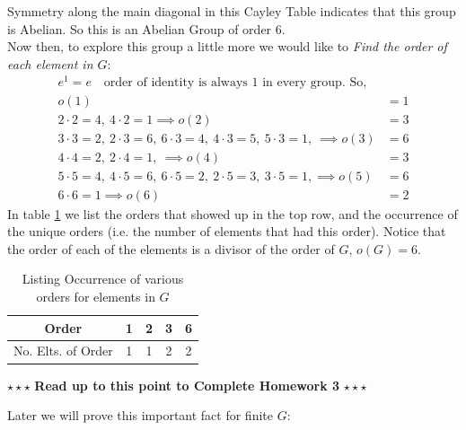 \begin{example}
\noindent Symmetry along the main diagonal in this Cayley Table indicates that this group is Abelian. So this is an Abelian Group of order 6. \steezybreak\\
\noindent Now then, to explore this group a little more we would like to \textit{Find the order of each element in $G$}:
\begin{align}
    e^1=e \ \ \ \text{ order of identity is always 1 in every group. So,}  \nonumber \\
    o(1)&=1  \nonumber \\
    2\cdot 2= 4, \ 4\cdot 2= 1 \implies o(2)&=3 \nonumber \\
    3\cdot 3= 2, \ 2\cdot 3= 6, \ 6\cdot 3=4,\ 4\cdot 3= 5,\ 5\cdot 3= 1,\ \implies  o(3)&=6 \nonumber \\
    4\cdot 4= 2,\ 2\cdot 4= 1, \ \implies o(4)&=3 \nonumber \\
    5\cdot 5= 4, \ 4\cdot 5= 6, \ 6\cdot 5=2,\ 2\cdot 5= 3,\ 3\cdot 5= 1, \implies o(5)&=6 \nonumber \\
    6\cdot 6 = 1 \implies o(6)&=2  \nonumber
\end{align}
In table \ref{tab:order_occur} we list the orders that showed up in the top row, and the occurrence of the unique orders (i.e. the number of elements that had this order). Notice that the order of each of the elements is a divisor of the order of $G$, $o(G)=6$.  
\begin{table}[h!]
    \centering
    \begin{tabular}{|c|c|c|c|c|}\hline
         Order&1&2&3&6   \\ \hline
         No. Elts. of Order& 1&1&2&2 \\ \hline
    \end{tabular}
    \caption{Listing Occurrence of various orders for elements in $G$}
    \label{tab:order_occur}
\end{table}
\end{example}
\steezybreak
\begin{tcolorbox}
\begin{center}
    $\star\star\star$ \textbf{Read up to this point to Complete Homework 3} $\star\star\star$
\end{center}
\end{tcolorbox}
\steezybreak
\newpage
\noindent Later we will prove this important fact for finite $G$:
